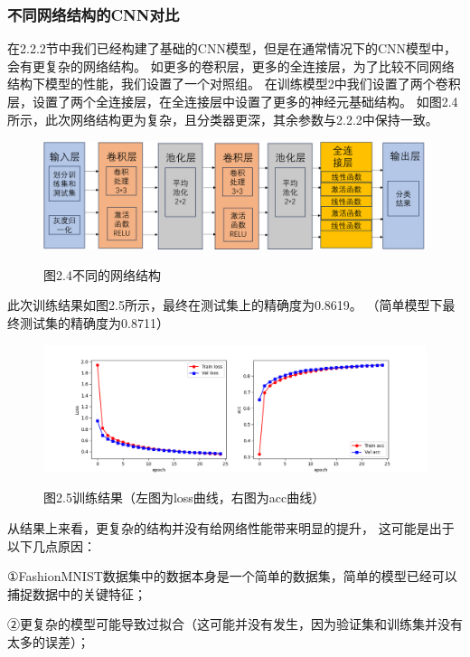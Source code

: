 \documentclass[10.5pt,compsoc,UTF8]{CjC}
\theoremstyle{mystyle}
\begin{document}
\subsubsection{不同网络结构的CNN对比}

在2.2.2节中我们已经构建了基础的CNN模型，但是在通常情况下的CNN模型中，会有更复杂的网络结构。
如更多的卷积层，更多的全连接层，为了比较不同网络结构下模型的性能，我们设置了一个对照组。
在训练模型2中我们设置了两个卷积层，设置了两个全连接层，在全连接层中设置了更多的神经元基础结构。
如图2.4所示，此次网络结构更为复杂，且分类器更深，其余参数与2.2.2中保持一致。

\begin{figure}[htbp]
\centering
\centerline{\includegraphics[width=1\linewidth]{CNN24.png}}
\heiti 图2.4\quad  不同的网络结构
\label{fig1}
\end{figure}

此次训练结果如图2.5所示，最终在测试集上的精确度为0.8619。
（简单模型下最终测试集的精确度为0.8711）


\begin{figure}[htbp]
\centering
\vspace {-8mm}
\centerline{\includegraphics[width=1\linewidth]{CNN25.png}}
\heiti 图2.5\quad  训练结果（左图为loss曲线，右图为acc曲线）
\label{fig1}
\end{figure}
  
\vspace {-2mm}
从结果上来看，更复杂的结构并没有给网络性能带来明显的提升，
这可能是出于以下几点原因：

①FashionMNIST数据集中的数据本身是一个简单的数据集，简单的模型已经可以捕捉数据中的关键特征；

②更复杂的模型可能导致过拟合（这可能并没有发生，因为验证集和训练集并没有太多的误差）；
\end{document}
